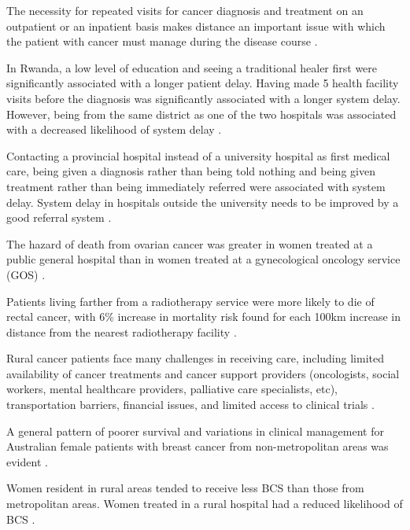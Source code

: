The necessity for repeated visits for cancer diagnosis and treatment on an outpatient or an inpatient basis makes distance an important issue with which the patient with cancer must manage during the disease course \cite{guidry_transportation_1997}.

In Rwanda, a low level of education and seeing a traditional healer first were significantly associated with a longer patient delay. Having made 5 health facility visits before the diagnosis was significantly associated with a longer system delay. However, being from the same district as one of the two hospitals was associated with a decreased likelihood of system delay \cite{pace_delays_2015}.

Contacting a provincial hospital instead of a university hospital as first medical care, being given a diagnosis rather than being told nothing and being given treatment rather than being immediately referred were associated with system delay. System delay in hospitals outside the university needs to be improved by a good referral system \cite{thongsuksai_delay_2000}.

The hazard of death from ovarian cancer was greater in women treated at a public general hospital than in women treated at a gynecological oncology service (GOS) \cite{tracey_effects_2014}.

Patients living farther from a radiotherapy service were more likely to die of rectal cancer, with 6\% increase in mortality risk found for each 100km increase in distance from the nearest radiotherapy facility \cite{baade_distance_2011}.

Rural cancer patients face many challenges in receiving care, including limited availability of cancer treatments and cancer support providers (oncologists, social workers, mental healthcare providers, palliative care specialists, etc), transportation barriers, financial issues, and limited access to clinical trials \cite{charlton_challenges_2015}.

A general pattern of poorer survival and variations in clinical management for Australian female patients with breast cancer from non-metropolitan areas was evident \cite{dasgupta_variations_2018}.

Women resident in rural areas tended to receive less BCS than those from metropolitan areas. Women treated in a rural hospital had a reduced likelihood of BCS \cite{hall_unequal_2004}.

